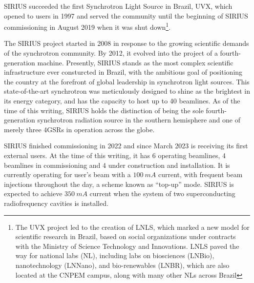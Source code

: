 SIRIUS succeeded the first Synchrotron Light Source in Brazil, UVX, which opened to users in 1997 and served the community until the beginning of SIRIUS commissioning in August 2019 when it was shut down\footnote{The UVX project led to the creation of LNLS, which marked a new model for scientific research in Brazil, based on social organizations under contracts with the Ministry of Science Technology and Innovations. LNLS paved the way for national labs (NL), including labs on biosciences (LNBio), nanotechnology (LNNano), and bio-renewables (LNBR), which are also located at the CNPEM campus, along with many other NLs across Brazil}.

The SIRIUS project started in 2008 in response to the growing scientific demands of the synchrotron community. By 2012, it evolved into the project of a fourth-generation machine. Presently, SIRIUS stands as the most complex scientific infrastructure ever consturcted in Brazil, with the ambitious goal of positioning the country at the forefront of global leadership in synchrotron light sources. This state-of-the-art synchrotron was meticulously designed to shine as the brightest in its energy category, and has the capacity to host up to 40 beamlines. As of the time of this writing, SIRIUS holds the distinction of being the sole fourth-generation synchrotron radiation source in the southern hemisphere and one of merely three 4GSRs in operation across the globe.

SIRIUS finished commissioning in 2022 and since March 2023 is receiving its first external users. At the time of this writing, it has 6 operating beamlines, 4 beamlines in commissioning and 4 under construction and installation. It is currently operating for user's beam with a $100~\unit{mA}$ current, with frequent beam injections throughout the day, a scheme known as ``top-up'' mode. SIRIUS is expected to achieve $350~\unit{mA}$ current when the system of two superconducting radiofrequency cavities is installed.

